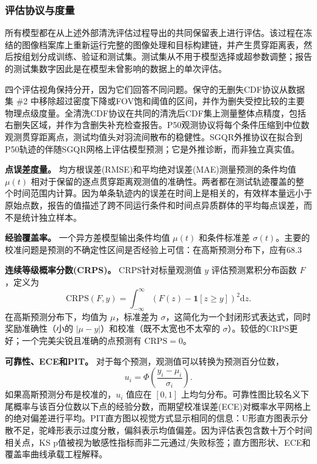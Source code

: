 \subsubsection{评估协议与度量}
\label{sec:evaluation-protocol-en}

所有模型都在从上述外部清洗评估过程导出的共同保留表上进行评估。该过程在冻结的图像档案库上重新运行完整的图像处理和目标构建链，并产生贯穿距离表，然后按组划分成训练、验证和测试集。测试集从不用于模型选择或超参数调整；报告的测试集数字因此是在模型未曾影响的数据上的单次评估。

四个评估视角保持分开，因为它们回答不同问题。保守的无删失CDF协议从数据集 \#2 中移除超过密度下降或FOV饱和阈值的区间，并作为删失受控比较的主要物理点级度量。全清洗CDF协议在共同的清洗后CDF集上测量整体点精度，包括右删失区域，并作为含删失补充检查报告。P50观测协议将每个条件压缩到中位数观测贯穿距离点，测试均值头对羽流间散布的稳健性。SGQR外推协议在拟合到P50轨迹的伴随SGQR网格上评估模型预测；它是外推诊断，而非独立真实值。

\textbf{点误差度量。} 均方根误差(RMSE)和平均绝对误差(MAE)测量预测的条件均值 $\mu(t)$ 相对于保留的逐点贯穿距离观测值的准确性。两者都在测试轨迹覆盖的整个时间范围内计算。因为单条轨迹内的误差在时间上是相关的，有效样本量远小于原始点数，报告的值描述了跨不同运行条件和时间点异质群体的平均每点误差，而不是统计独立样本。

\textbf{经验覆盖率。} 一个异方差模型输出条件均值 $\mu(t)$ 和条件标准差 $\sigma(t)$。主要的校准问题是预测的不确定性区间是否经验上可信：在高斯预测分布下，应有68.3%

\textbf{连续等级概率分数(CRPS)。} CRPS针对标量观测值 $y$ 评估预测累积分布函数 $F$，定义为
\[
\mathrm{CRPS}(F,y) = \int_{-\infty}^{\infty}\!\left(F(z)-\mathbf{1}[z\geq y]\right)^2\mathrm{d}z.
\]
在高斯预测分布下，均值为 $\mu$，标准差为 $\sigma$，这简化为一个封闭形式表达式，同时奖励准确性（小的 $|\mu-y|$）和校准（既不太宽也不太窄的 $\sigma$）。较低的CRPS更好；一个完美尖锐且准确的点预测有 $\mathrm{CRPS}=0$。

\textbf{可靠性、ECE和PIT。} 对于每个预测，观测值可以转换为预测百分位数，
\[
u_i=\Phi\!\left(\frac{y_i-\mu_i}{\sigma_i}\right).
\]
如果高斯预测分布是校准的，\(u_i\) 值应在 \([0,1]\) 上均匀分布。可靠性图比较名义下尾概率与该百分位数以下点的经验分数，而期望校准误差(ECE)对概率水平网格上的绝对偏差进行平均。PIT直方图以视觉方式显示相同的信息：U形直方图表示分散不足，驼峰形表示过度分散，偏斜表示均值偏差。因为评估表包含数十万个时间相关点，KS p值被视为敏感性指标而非二元通过/失败标签；直方图形状、ECE和覆盖率曲线承载工程解释。

